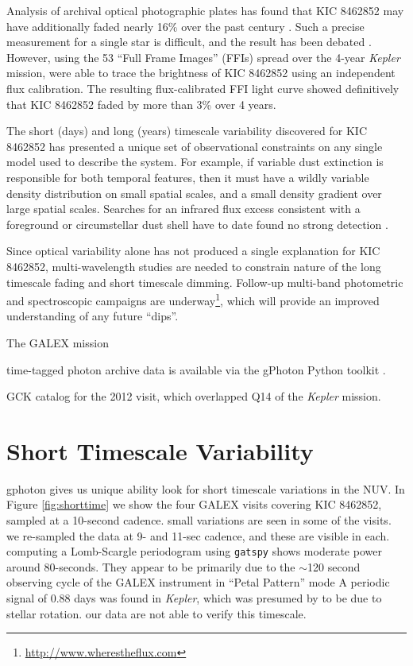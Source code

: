 \documentclass[twocolumn]{aastex6}
\newcommand{\Kepler}{\textsl{Kepler}\xspace}
\begin{document}
Analysis of archival optical photographic plates has found that KIC 8462852 may have additionally faded nearly 16\% over the past century \citep{schaefer2016}. Such a precise measurement for a single star is difficult, and the result has been debated \citep{hippke2016}. However, using the 53 ``Full Frame Images'' (FFIs) spread over the 4-year \Kepler mission, \citet{montet2016} were able to trace the brightness of KIC 8462852 using an independent flux calibration. The resulting flux-calibrated FFI light curve showed definitively that KIC 8462852 faded by more than 3\% over 4 years. %

The short (days) and long (years) timescale variability discovered for KIC 8462852 has presented a unique set of observational constraints on any single model used to describe the system. For example, if variable dust extinction is responsible for both temporal features, then it must have a wildly variable density distribution on small spatial scales, and a small density gradient over large spatial scales. Searches for an infrared flux excess consistent with a foreground or circumstellar dust shell have to date found no strong detection \citep{marengo2015}.


Since optical variability alone has not produced a single explanation for KIC 8462852, multi-wavelength studies are needed to constrain nature of the long timescale fading and short timescale dimming. Follow-up multi-band photometric and spectroscopic campaigns are underway\footnote{\url{http://www.wherestheflux.com}}, which will provide an improved understanding of any future ``dips''. 


The GALEX mission \citep{galex}

time-tagged photon archive data \citep{million2016} is available via the gPhoton Python toolkit \citep{gphoton}.

GCK catalog \citep{olmedo2015} for the 2012 visit, which overlapped Q14 of the \Kepler mission.






\section{Short Timescale Variability}

gphoton gives us unique ability look for short timescale variations in the NUV.  In Figure \ref{fig:shorttime} we show the four GALEX visits covering KIC 8462852, sampled at a 10-second cadence. small variations are seen in some of the visits. we re-sampled the data at 9- and 11-sec cadence, and these are visible in each. computing a Lomb-Scargle periodogram using {\tt gatspy} \citep{gatspy} shows moderate power around 80-seconds. They appear to be primarily due to the $\sim$120 second observing cycle of the GALEX instrument in ``Petal Pattern'' mode 
A periodic signal of 0.88 days was found in \Kepler, which was presumed by \citet{boyajian2015} to be due to stellar rotation. our data are not able to verify this timescale.
\end{document}
